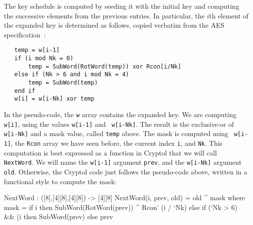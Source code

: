The key schedule is computed by seeding it with the initial key and
computing the successive elements from the previous entries.  In
particular, the $i$th element of the expanded key is determined as
follows, copied verbatim from the AES\indAES
specification~\cite[figure 11; section 5.2]{aes}:
\begin{Verbatim}
   temp = w[i-1]
   if (i mod Nk = 0)
       temp = SubWord(RotWord(temp)) xor Rcon[i/Nk]
   else if (Nk > 6 and i mod Nk = 4)
       temp = SubWord(temp)
   end if
   w[i] = w[i-Nk] xor temp
\end{Verbatim}
In the pseudo-code, the {\tt w} array contains the expanded key. We
are computing {\tt w[i]}, using the values {\tt w[i-1]} and {\tt
  w[i-Nk]}.  The result is the exclusive-or of {\tt w[i-Nk]} and a
mask value, called {\tt temp} above. The mask is computed using {\tt
  w[i-1]}, the {\tt Rcon} array we have seen before, the current index
{\tt i}, and {\tt Nk}.  This computation is best expressed as a
function in Cryptol that we will call {\tt NextWord}.  We will name
the {\tt w[i-1]} argument {\tt prev}, and the {\tt w[i-Nk]} argument
{\tt old}. Otherwise, the Cryptol code just follows the pseudo-code
above, written in a functional style to compute the mask:
\begin{code}
  NextWord : ([8],[4][8],[4][8]) -> [4][8]
  NextWord(i, prev, old) = old ^ mask
     where mask = if i %
                  then SubWord(RotWord(prev)) ^ Rcon' (i / `Nk)
                  else if (`Nk > 6) && (i %
                       then SubWord(prev)
                       else prev
\end{code}

